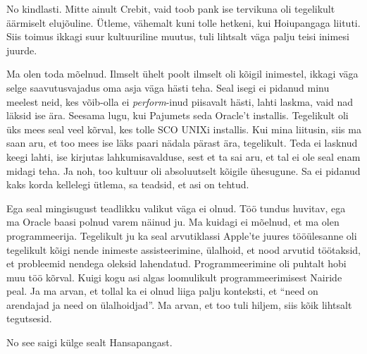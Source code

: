 
No kindlasti. Mitte ainult Crebit, vaid toob pank ise tervikuna oli tegelikult 
äärmiselt elujõuline. Ütleme, vähemalt kuni tolle hetkeni, kui
Hoiupangaga liituti. Siis toimus ikkagi suur kultuuriline 
muutus, tuli lihtsalt väga palju teisi inimesi juurde.


Ma olen toda mõelnud. Ilmselt ühelt poolt ilmselt oli kõigil inimestel, 
ikkagi väga selge saavutusvajadus oma asja väga hästi teha. Seal 
isegi ei pidanud minu meelest neid, kes võib-olla ei \emph{perform}-inud 
piisavalt hästi, lahti laskma, vaid nad läksid ise ära. Seesama lugu, kui  
Pajumets seda Oracle't installis. 
Tegelikult oli üks mees seal veel kõrval, kes tolle SCO UNIXi installis. 
Kui mina liitusin, siis ma saan aru, et too mees ise läks paari nädala pärast 
ära, tegelikult. Teda ei lasknud keegi lahti, ise kirjutas lahkumisavalduse, 
sest et ta sai aru, et tal ei ole seal enam midagi teha. Ja noh, too kultuur 
oli absoluutselt kõigile ühesugune. Sa ei pidanud kaks korda kellelegi ütlema, 
sa teadsid, et asi on tehtud.


Ega seal mingisugust  teadlikku valikut väga ei olnud. Töö tundus huvitav, ega 
ma Oracle baasi polnud varem näinud ju. Ma kuidagi ei mõelnud, et ma olen 
programmeerija. Tegelikult ju ka seal arvutiklassi Apple'te juures  tööülesanne 
oli tegelikult kõigi nende inimeste assisteerimine, ülalhoid, et nood arvutid 
töötaksid, et probleemid nendega oleksid lahendatud. Programmeerimine oli 
puhtalt hobi muu töö kõrval. Kuigi kogu asi algas loomulikult 
programmeerimisest Nairide peal. Ja ma arvan, et tollal ka ei olnud liiga palju 
konteksti, et \enquote{need on arendajad ja need on ülalhoidjad}. Ma arvan, et 
too tuli hiljem, siis kõik lihtsalt tegutsesid.


No see saigi külge sealt Hansapangast. 

